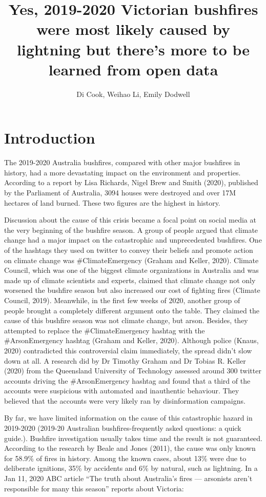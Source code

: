 \documentclass[
  11pt,
  a4paper,
]{article}
\title{Yes, 2019-2020 Victorian bushfires were most likely caused by lightning but there's more to be learned from open data}
\author{Di Cook, Weihao Li, Emily Dodwell}
\date{}
\begin{document}
\maketitle

\hypertarget{intro}{%
\section{Introduction}\label{intro}}

The 2019-2020 Australia bushfires, compared with other major bushfires in history, had a more devastating impact on the environment and properties. According to a report by Lisa Richards, Nigel Brew and Smith (2020), published by the Parliament of Australia, 3094 houses were destroyed and over 17M hectares of land burned. These two figures are the highest in history.

Discussion about the cause of this crisis became a focal point on social media at the very beginning of the bushfire season. A group of people argued that climate change had a major impact on the catastrophic and unprecedented bushfires. One of the hashtags they used on twitter to convey their beliefs and promote action on climate change was \#ClimateEmergency (Graham and Keller, 2020). Climate Council, which was one of the biggest climate organizations in Australia and was made up of climate scientists and experts, claimed that climate change not only worsened the bushfire season but also increased our cost of fighting fires (Climate Council, 2019). Meanwhile, in the first few weeks of 2020, another group of people brought a completely different argument onto the table. They claimed the cause of this bushfire season was not climate change, but arson. Besides, they attempted to replace the \#ClimateEmergency hashtag with the \#ArsonEmergency hashtag (Graham and Keller, 2020). Although police (Knaus, 2020) contradicted this controversial claim immediately, the spread didn't slow down at all. A research did by Dr Timothy Graham and Dr Tobias R. Keller (2020) from the Queensland University of Technology assessed around 300 twitter accounts driving the \#ArsonEmergency hashtag and found that a third of the accounts were suspicious with automated and inauthentic behaviour. They believed that the accounts were very likely ran by disinformation campaigns.

By far, we have limited information on the cause of this catastrophic hazard in 2019-2020 (2019-20 Australian bushfires-frequently asked
questions: a quick guide.). Bushfire investigation usually takes time and the result is not guaranteed. According to the research by Beale and Jones (2011), the cause was only known for 58.9\% of fires in history. Among the known cases, about 13\% were due to deliberate ignitions, 35\% by accidents and 6\% by natural, such as lightning. In a Jan 11, 2020 ABC article ``The truth about Australia's fires --- arsonists aren't responsible for many this season'' reports about Victoria:
\end{document}
